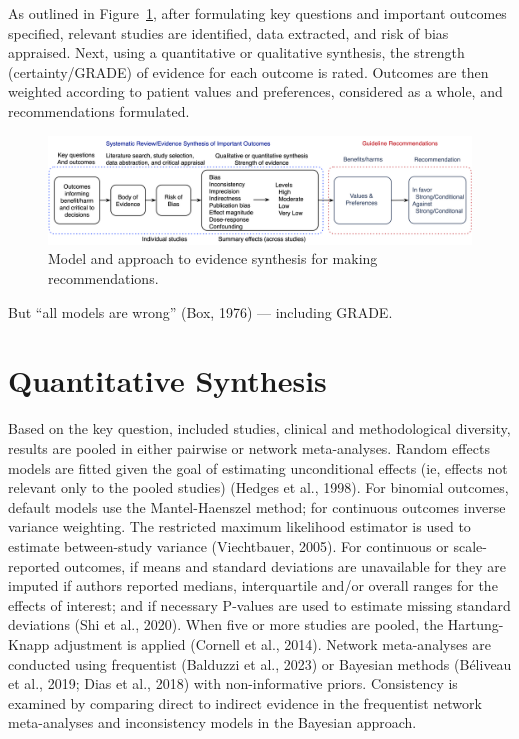 \documentclass[
  letterpaper,
  DIV=11,
  numbers=noendperiod]{scrreprt}
\begin{document}
As outlined in Figure~\ref{fig-grade}, after formulating key questions
and important outcomes specified, relevant studies are identified, data
extracted, and risk of bias appraised. Next, using a quantitative or
qualitative synthesis, the strength (certainty/GRADE) of evidence for
each outcome is rated. Outcomes are then weighted according to patient
values and preferences, considered as a whole, and recommendations
formulated.

\begin{figure}

\caption{\label{fig-grade}Model and approach to evidence synthesis for
making recommendations.}

{\centering \includegraphics{assets/grade.png}

}

\end{figure}

But ``all models are wrong'' (Box, 1976) --- including GRADE.

\hypertarget{quantitative-synthesis}{%
\section{Quantitative Synthesis}\label{quantitative-synthesis}}

Based on the key question, included studies, clinical and methodological
diversity, results are pooled in either pairwise or network
meta-analyses. Random effects models are fitted given the goal of
estimating unconditional effects (ie, effects not relevant only to the
pooled studies) (Hedges et al., 1998). For binomial outcomes, default
models use the Mantel-Haenszel method; for continuous outcomes inverse
variance weighting. The restricted maximum likelihood estimator is used
to estimate between-study variance (Viechtbauer, 2005). For continuous
or scale-reported outcomes, if means and standard deviations are
unavailable for they are imputed if authors reported medians,
interquartile and/or overall ranges for the effects of interest; and if
necessary P-values are used to estimate missing standard deviations (Shi
et al., 2020). When five or more studies are pooled, the Hartung-Knapp
adjustment is applied (Cornell et al., 2014). Network meta-analyses are
conducted using frequentist (Balduzzi et al., 2023) or Bayesian methods
(Béliveau et al., 2019; Dias et al., 2018) with non-informative priors.
Consistency is examined by comparing direct to indirect evidence in the
frequentist network meta-analyses and inconsistency models in the
Bayesian approach.
\end{document}
